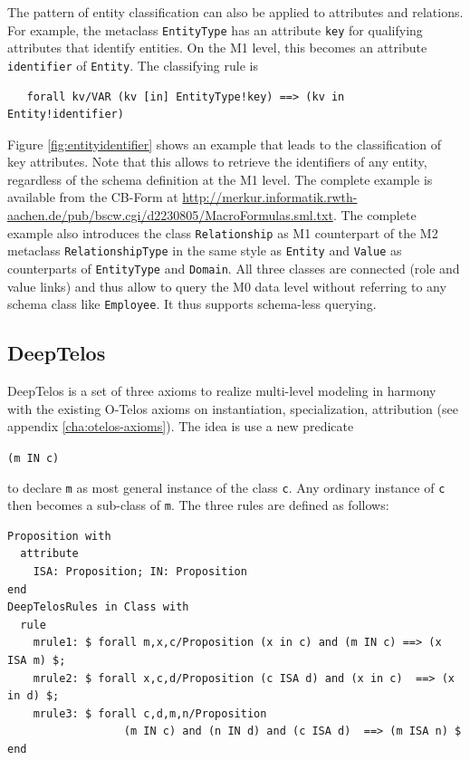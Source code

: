 
The pattern of entity classification can also be applied to attributes and relations.
For example, the metaclass {\tt EntityType} has an attribute {\tt key} for
qualifying attributes that identify entities. On the M1 level, this becomes
an attribute {\tt identifier} of {\tt Entity}. The classifying rule is

{\small
\begin{verbatim}
   forall kv/VAR (kv [in] EntityType!key) ==> (kv in Entity!identifier)
\end{verbatim}
}



Figure \ref{fig:entityidentifier} shows an example that leads to the classification of key
attributes. Note that this allows to retrieve the identifiers of any entity, regardless of
the schema definition at the M1 level.
The complete example is available from the
CB-Form at \url{http://merkur.informatik.rwth-aachen.de/pub/bscw.cgi/d2230805/MacroFormulas.sml.txt}.
The complete example also introduces the class {\tt Relationship} as M1 counterpart of
the M2 metaclass {\tt RelationshipType} in the same style as 
{\tt Entity} and {\tt Value} as counterparts of {\tt EntityType} and {\tt Domain}. All three
classes are connected (role and value links) and thus allow to query the M0 data level
without referring to any schema class like {\tt Employee}. It thus supports schema-less
querying.

\subsection{DeepTelos}
\label{sec:deeptelos}

DeepTelos is a set of three axioms to realize multi-level modeling in harmony with the
existing O-Telos axioms on instantiation, specialization, attribution (see appendix
\ref{cha:otelos-axioms}). The idea is use a new predicate
\centerline{\tt (m IN c)}
to declare
{\tt m} as most general instance \cite{JN2016} of the class {\tt c}. Any ordinary instance of {\tt c}
then becomes a sub-class of {\tt m}. The three rules are defined as follows:

{\small
\begin{verbatim}
Proposition with
  attribute
    ISA: Proposition; IN: Proposition
end
DeepTelosRules in Class with
  rule
    mrule1: $ forall m,x,c/Proposition (x in c) and (m IN c) ==> (x ISA m) $;
    mrule2: $ forall x,c,d/Proposition (c ISA d) and (x in c)  ==> (x in d) $;
    mrule3: $ forall c,d,m,n/Proposition
                  (m IN c) and (n IN d) and (c ISA d)  ==> (m ISA n) $ 
end
\end{verbatim}
}


